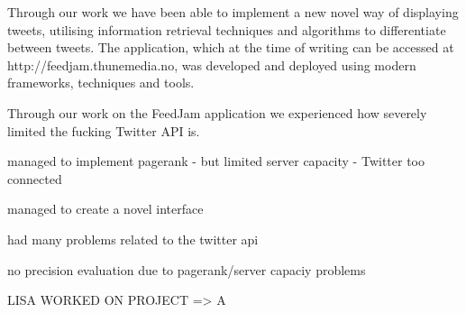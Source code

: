 Through our work we have been able to implement a new novel way of displaying tweets, utilising information retrieval techniques and algorithms to differentiate between tweets. The application, which at the time of writing can be accessed at http://feedjam.thunemedia.no, was developed and deployed using modern frameworks, techniques and tools.

Through our work on the FeedJam application we experienced how severely limited the fucking Twitter API is.

managed to implement pagerank
- but limited server capacity
- Twitter too connected

managed to create a novel interface

had many problems related to the twitter api

no precision evaluation due to pagerank/server capaciy problems

LISA WORKED ON PROJECT => A